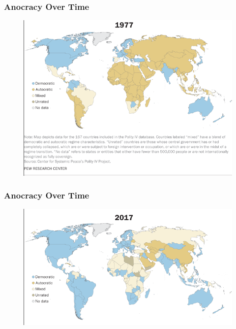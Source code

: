 \documentclass{beamer}
\begin{document}
\begin{frame} 
	\frametitle{\LARGE{Anocracy Over Time}}
	\begin{figure}[ht!]
		\centering
		\includegraphics[width=\textwidth,height=.9\textheight,keepaspectratio]{anocracy1.png}
	\end{figure}
\end{frame}

\begin{frame} 
	\frametitle{\LARGE{Anocracy Over Time}}
	\begin{figure}[ht!]
		\centering
		\includegraphics[width=\textwidth,height=\textheight,keepaspectratio]{anocracy2.png}
	\end{figure}
\end{frame}
\end{document}
